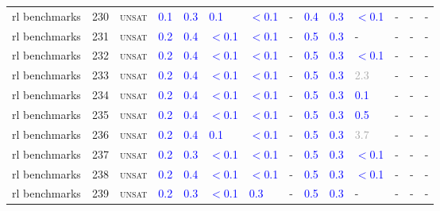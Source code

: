 \begin{center}
{\begin{longtable}{@{}llllllllllllll@{}}
rl benchmarks & 230 & \textsc{unsat} & \textcolor{blue}{0.1} & \textcolor{blue}{0.3} & \textcolor{blue}{0.1} & \textcolor{blue}{$<$0.1} & - & \textcolor{blue}{0.4} & \textcolor{blue}{0.3} & \textcolor{blue}{$<$0.1} & - & - & - \\
rl benchmarks & 231 & \textsc{unsat} & \textcolor{blue}{0.2} & \textcolor{blue}{0.4} & \textcolor{blue}{$<$0.1} & \textcolor{blue}{$<$0.1} & - & \textcolor{blue}{0.5} & \textcolor{blue}{0.3} & - & - & - & - \\
rl benchmarks & 232 & \textsc{unsat} & \textcolor{blue}{0.2} & \textcolor{blue}{0.4} & \textcolor{blue}{$<$0.1} & \textcolor{blue}{$<$0.1} & - & \textcolor{blue}{0.5} & \textcolor{blue}{0.3} & \textcolor{blue}{$<$0.1} & - & - & - \\
rl benchmarks & 233 & \textsc{unsat} & \textcolor{blue}{0.2} & \textcolor{blue}{0.4} & \textcolor{blue}{$<$0.1} & \textcolor{blue}{$<$0.1} & - & \textcolor{blue}{0.5} & \textcolor{blue}{0.3} & \textcolor{darkgray}{2.3} & - & - & - \\
rl benchmarks & 234 & \textsc{unsat} & \textcolor{blue}{0.2} & \textcolor{blue}{0.4} & \textcolor{blue}{$<$0.1} & \textcolor{blue}{$<$0.1} & - & \textcolor{blue}{0.5} & \textcolor{blue}{0.3} & \textcolor{blue}{0.1} & - & - & - \\
rl benchmarks & 235 & \textsc{unsat} & \textcolor{blue}{0.2} & \textcolor{blue}{0.4} & \textcolor{blue}{$<$0.1} & \textcolor{blue}{$<$0.1} & - & \textcolor{blue}{0.5} & \textcolor{blue}{0.3} & \textcolor{blue}{0.5} & - & - & - \\
rl benchmarks & 236 & \textsc{unsat} & \textcolor{blue}{0.2} & \textcolor{blue}{0.4} & \textcolor{blue}{0.1} & \textcolor{blue}{$<$0.1} & - & \textcolor{blue}{0.5} & \textcolor{blue}{0.3} & \textcolor{darkgray}{3.7} & - & - & - \\
rl benchmarks & 237 & \textsc{unsat} & \textcolor{blue}{0.2} & \textcolor{blue}{0.3} & \textcolor{blue}{$<$0.1} & \textcolor{blue}{$<$0.1} & - & \textcolor{blue}{0.5} & \textcolor{blue}{0.3} & \textcolor{blue}{$<$0.1} & - & - & - \\
rl benchmarks & 238 & \textsc{unsat} & \textcolor{blue}{0.2} & \textcolor{blue}{0.4} & \textcolor{blue}{$<$0.1} & \textcolor{blue}{$<$0.1} & - & \textcolor{blue}{0.5} & \textcolor{blue}{0.3} & \textcolor{blue}{$<$0.1} & - & - & - \\
rl benchmarks & 239 & \textsc{unsat} & \textcolor{blue}{0.2} & \textcolor{blue}{0.3} & \textcolor{blue}{$<$0.1} & \textcolor{blue}{0.3} & - & \textcolor{blue}{0.5} & \textcolor{blue}{0.3} & - & - & - & - \\

\end{longtable}}
\end{center}

